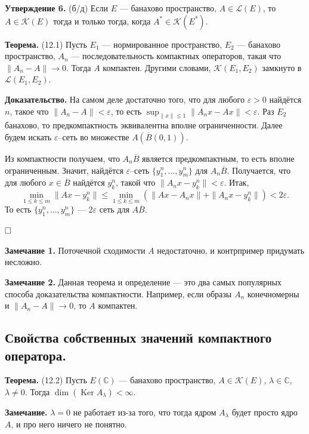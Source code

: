 \documentclass[12pt, a4paper]{article}
\DeclareMathOperator{\Ker}{Ker}
\newcommand{\QED}{$\hfill\square$}
\renewcommand{\le}{\leqslant}  %
\begin{document}
\textbf{Утверждение 6.} (б/д) Если $E$ --- банахово пространство, $A \in \mathcal L(E)$, то $A \in \mathcal K(E)$ тогда и только тогда, когда $A^* \in \mathcal K(E^*)$.

 \label{th:12-1} \textbf{Теорема.} (12.1) Пусть $E_1$ --- нормированное пространство, $E_2$ --- банахово пространство, $A_n$ --- последовательность компактных операторов, такая что $\|A_n - A\| \to 0$.
Тогда $A$ компактен.
Другими словами, $\mathcal{K}(E_1, E_2)$ замкнуто в $\mathcal{L}(E_1, E_2)$.

\textbf{Доказательство.} 
На самом деле достаточно того, что для любого $\varepsilon > 0$ найдётся $n$, такое что $\|A_n - A\| < \varepsilon$, то есть $\sup_{\|x\| \le 1} \|A_n x - Ax \| < \varepsilon$.
Раз $E_2$ банахово, то предкомпактность эквивалентна вполне ограниченности.
Далее будем искать $\varepsilon$--сеть во множестве $A (\overline B(0, 1))$.

Из компактности получаем, что $A_n \overline B$ является предкомпактным, то есть вполне ограниченным.
Значит, найдётся $\varepsilon$--сеть $\{y_1^n, \dots, y_m^n\}$ для $A_n \overline B$.
Получается, что для любого $x \in \overline B$ найдётся $y_k^n$, такой что $\|A_n x - y_k^n\| < \varepsilon$.
Итак,
\[
    \min_{1 \le k \le m} \|Ax - y_k^n\| \le \min_{1 \le k \le m} \left( \|Ax - A_n x \| + \|A_n x - y_k^n \| \right) < 2\varepsilon.
\]
То есть $\{y_1^n, \dots, y_m^n\}$ --- 2$\varepsilon$ сеть для $A \overline B$.

\QED

\textbf{Замечание 1.} Поточечной сходимости $A$ недостаточно, и контрпример придумать несложно.

\textbf{Замечание 2.} Данная теорема и определение --- это два самых популярных способа доказательства компактности.
Например, если образы $A_n$ конечномерны и $\|A_n - A\| \to 0$, то $A$ компактен.



\subsection{Свойства собственных значений компактного оператора.}

 \label{th:12-2} \textbf{Теорема.} (12.2) Пусть $E(\mathbb C)$ --- банахово пространство, $A \in \mathcal K(E)$, $\lambda \in \mathbb C$, $\lambda \ne 0$.
Тогда $\dim(\Ker A_\lambda) < \infty$.

\textbf{Замечание.} $\lambda = 0$ не работает из-за того, что тогда ядром $A_\lambda$ будет просто ядро $A$, и про него ничего не понятно.
\end{document}
